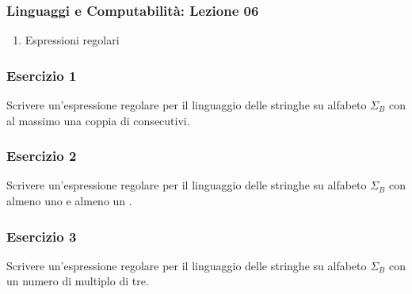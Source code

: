 




\begin{frame}[fragile]
	\frametitle{Linguaggi e Computabilità: Lezione 06}
\begin{enumerate}
\item
Espressioni regolari
\end{enumerate}
\end{frame}

\begin{frame}
\frametitle{Esercizio 1}
Scrivere un'espressione regolare per il linguaggio delle stringhe su alfabeto $\Sigma_{B}$ con al massimo una coppia
di \uno consecutivi.
\end{frame}

\begin{frame}
\frametitle{Esercizio 2}
Scrivere un'espressione regolare per il linguaggio delle stringhe su alfabeto $\Sigma_{B}$ con almeno uno \zero e
almeno un \uno.
\end{frame}

\begin{frame}
\frametitle{Esercizio 3}
Scrivere un'espressione regolare per il linguaggio delle stringhe su alfabeto $\Sigma_{B}$ con un numero di \uno
multiplo di tre.
\end{frame}


